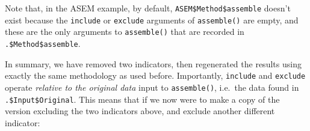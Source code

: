 \documentclass[
]{book}
\newenvironment{Shaded}{\begin{snugshade}}{\end{snugshade}}
\newcommand{\AttributeTok}[1]{\textcolor[rgb]{0.77,0.63,0.00}{#1}}
\newcommand{\CommentTok}[1]{\textcolor[rgb]{0.56,0.35,0.01}{\textit{#1}}}
\newcommand{\ConstantTok}[1]{\textcolor[rgb]{0.00,0.00,0.00}{#1}}
\newcommand{\FunctionTok}[1]{\textcolor[rgb]{0.00,0.00,0.00}{#1}}
\newcommand{\NormalTok}[1]{#1}
\newcommand{\OtherTok}[1]{\textcolor[rgb]{0.56,0.35,0.01}{#1}}
\newcommand{\SpecialCharTok}[1]{\textcolor[rgb]{0.00,0.00,0.00}{#1}}
\newcommand{\StringTok}[1]{\textcolor[rgb]{0.31,0.60,0.02}{#1}}
\begin{document}
\begin{Shaded}
\end{Shaded}

Note that, in the ASEM example, by default, \texttt{ASEM\$Method\$assemble} doesn't exist because the \texttt{include} or \texttt{exclude} arguments of \texttt{assemble()} are empty, and these are the only arguments to \texttt{assemble()} that are recorded in \texttt{.\$Method\$assemble}.

In summary, we have removed two indicators, then regenerated the results using exactly the same methodology as used before. Importantly, \texttt{include} and \texttt{exclude} operate \emph{relative to the original data} input to \texttt{assemble()}, i.e.~the data found in \texttt{.\$Input\$Original}. This means that if we now were to make a copy of the version excluding the two indicators above, and exclude another different indicator:
\end{document}
